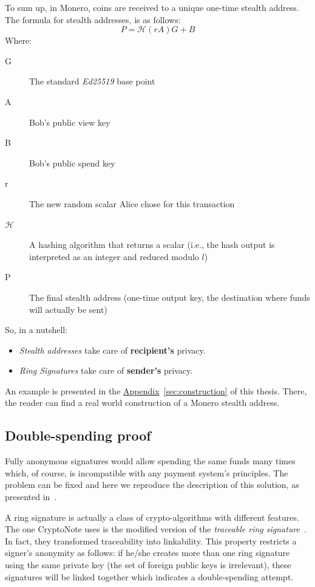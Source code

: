To sum up, in Monero, coins are received to a unique one-time stealth address. The formula for stealth addresses, is as follows:
\begin{equation}
  P = \mathcal{H}(rA)G + B
\end{equation}
%
Where:
\begin{description}
  \item [G] The standard \emph{Ed25519} base point
  \item [A] Bob's public view key
  \item [B] Bob's public spend key
  \item [r] The new random scalar Alice chose for this transaction
  \item [$\mathcal{H}$] A hashing algorithm that returns a scalar (i.e., the hash output is interpreted as an integer and reduced modulo $l$)
  \item [P] The final stealth address (one-time output key, the destination where funds will actually be sent)
\end{description}
So, in a nutshell:
\begin{itemize}
  \item \emph{Stealth addresses} take care of \textbf{recipient's} privacy.
  \item \emph{Ring Signatures} take care of \textbf{sender's} privacy.
\end{itemize}

An example is presented in the \hyperref[sec:construction]{Appendix}~\ref{sec:construction} of this thesis. There, the reader can find a real world construction of a Monero stealth address.
\clearpage
\pagebreak

\subsection{Double-spending proof}
Fully anonymous signatures would allow spending the same funds many times which, of course, is incompatible with any payment system's principles. The problem can be fixed and here we reproduce the description of this solution, as presented in~\cite{cryptonote}.

A ring signature is actually a class of crypto-algorithms with different features. The one CryptoNote uses is the modified version of the \emph{traceable ring signature}~\cite{traceable2}. In fact, they transformed traceability into linkability. This property restricts a signer's anonymity as follows: if he/she creates more than one ring signature using the same private key (the set of foreign public keys is irrelevant), these signatures will be linked together which indicates a double-spending attempt.


